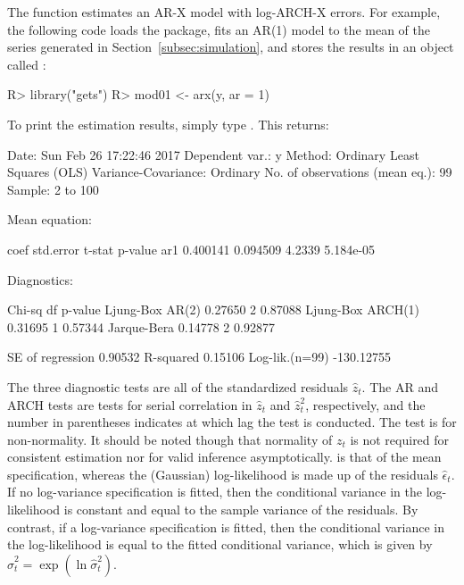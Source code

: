 \documentclass[article,nojss]{jss}
\begin{document}
The function  estimates an AR-X model with log-ARCH-X errors. For example, the following code loads the  package, fits an AR(1) model to the mean of the series  generated in Section~\ref{subsec:simulation}, and stores the results in an object called :
%
\begin{CodeChunk}
\begin{CodeInput}
R> library("gets")
R> mod01 <- arx(y, ar = 1)
\end{CodeInput}
\end{CodeChunk}
% 
To print the estimation results, simply type . This returns:
%
\begin{CodeChunk}
\begin{CodeOutput}
Date: Sun Feb 26 17:22:46 2017 
Dependent var.: y 
Method: Ordinary Least Squares (OLS) 
Variance-Covariance: Ordinary 
No. of observations (mean eq.): 99 
Sample: 2 to 100 

Mean equation:

        coef std.error t-stat   p-value
ar1 0.400141  0.094509 4.2339 5.184e-05

Diagnostics:

                   Chi-sq df p-value
Ljung-Box AR(2)   0.27650  2 0.87088
Ljung-Box ARCH(1) 0.31695  1 0.57344
Jarque-Bera       0.14778  2 0.92877

SE of regression    0.90532
R-squared           0.15106
Log-lik.(n=99)   -130.12755
\end{CodeOutput}
\end{CodeChunk}
% 
The three diagnostic tests are all of the standardized residuals $\widehat{z}_t$. The AR and ARCH tests are \cite{Ljungetal79} tests for serial correlation in $\widehat{z}_t$ and $\widehat{z}_t^2$, respectively, and the number in parentheses indicates at which lag the test is conducted. The \cite{JarqueBera1980} test is for non-normality. It should be noted though that normality of $z_t$ is not required for consistent estimation nor for valid inference asymptotically.  is that of the mean specification, whereas the (Gaussian) log-likelihood is made up of the residuals $\widehat{\epsilon}_t$. If no log-variance specification is fitted, then the conditional variance in the log-likelihood is constant and equal to the sample variance of the residuals. By contrast, if a log-variance specification is fitted, then the conditional variance in the log-likelihood is equal to the fitted conditional variance, which is given by $\widehat{\sigma}_t^2 = \exp(\ln\widehat{\sigma}_t^2)$.
\end{document}
